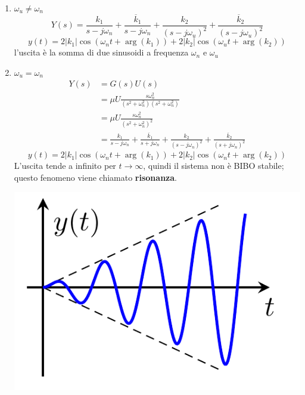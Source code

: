\documentclass{article}
\numberwithin{equation}{subsection}
\begin{document}
\begin{enumerate}[start=1,label={\arabic*)}]
    \item $\omega_u \neq \omega_n$
    \begin{equation*}
        Y(s) = \frac{k_1}{s-j \omega_n} + \frac{\overline{k}_1}{s-j \omega_n} + \frac{k_2}{(s-j \omega_u)^2} + \frac{\overline{k}_2}{(s-j \omega_u)^2}
    \end{equation*}
    \begin{equation*}
        y(t) = 2 |k_1| \cos(\omega_n t + \arg(k_1)) + 2|k_2| \cos(\omega_u t + \arg(k_2))
    \end{equation*}
    l'uscita è la somma di due sinusoidi a frequenza $\omega_n$ e $\omega_u$
    \item $\omega_u = \omega_n$
    \begin{align*}
        Y(s) &= G(s) U(s) \\
        &= \mu U \frac{s \omega_n^2}{(s^2+\omega_n^2)(s^2+\omega_n^2)} \\
        &= \mu U \frac{s \omega_n^2}{(s^2+\omega_n^2)^2}\\
        &= \frac{k_1}{s-j\omega_n} + \frac{\overline{k}_1}{s+j\omega_n} + \frac{k_2}{(s-j\omega_n)^2} + \frac{\overline{k}_2}{(s+j\omega_n)^2}
    \end{align*}
    \begin{equation*}
        y(t) = 2 |k_1| \cos(\omega_n t + \arg(k_1)) + 2|k_2| \cos(\omega_n t + \arg(k_2))
    \end{equation*}
    L'uscita tende a infinito per $t \rightarrow \infty$, quindi il sistema non è BIBO stabile; questo fenomeno viene chiamato \textbf{risonanza}.
    \begin{center}
        \includegraphics[scale=0.25]{Images/Risonanza.png}
    \end{center}
\end{enumerate}
\end{document}

